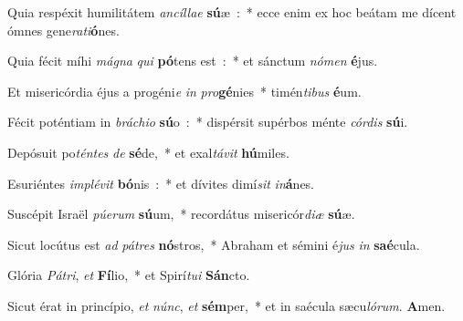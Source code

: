 ﻿\item Quia respéxit humilitátem \emph{an}\-\emph{cíl}\-\emph{lae} \textbf{sú}\-æ~:~* ecce enim ex hoc beátam me dícent ómnes gene\emph{ra}\-\emph{ti}\-\textbf{ó}\-nes.
\item Quia fécit míhi \emph{má}\-\emph{gna} \emph{qui} \textbf{pó}\-tens est~:~* et sánctum \emph{nó}\-\emph{men} \textbf{é}\-jus.
\item Et misericórdia éjus a progéni\emph{e} \emph{in} \emph{pro}\-\textbf{gé}\-nies~* timén\emph{ti}\-\emph{bus} \textbf{é}\-um.
\item Fécit poténtiam in \emph{brá}\-\emph{chi}\-\emph{o} \textbf{sú}\-o~:~* dispérsit supérbos ménte \emph{cór}\-\emph{dis} \textbf{sú}\-i.
\item Depósuit po\emph{tén}\-\emph{tes} \emph{de} \textbf{sé}\-de,~* et exal\emph{tá}\-\emph{vit} \textbf{hú}\-miles.
\item Esuriéntes \emph{im}\-\emph{plé}\-\emph{vit} \textbf{bó}\-nis~:~* et dívites dimí\emph{sit} \emph{in}\-\textbf{á}\-nes.
\item Suscépit Israël \emph{pú}\-\emph{e}\-\emph{rum} \textbf{sú}\-um,~* recordátus misericór\emph{di}\-\emph{æ} \textbf{sú}\-æ.
\item Sicut locútus est \emph{ad} \emph{pá}\-\emph{tres} \textbf{nó}\-stros,~* Abraham et sémini é\emph{jus} \emph{in} \textbf{saé}\-cula.
\item Glória \emph{Pá}\-\emph{tri}, \emph{et} \textbf{Fí}\-lio,~* et Spirí\emph{tu}\-\emph{i} \textbf{Sán}\-cto.
\item Sicut érat in princípio, \emph{et} \emph{núnc}, \emph{et} \textbf{sém}\-per,~* et in saécula sæcu\emph{ló}\-\emph{rum}. \textbf{A}\-men.
